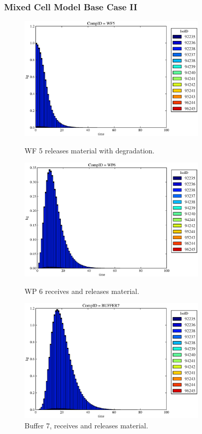 \begin{frame}[ctb!]
  \frametitle{Mixed Cell Model Base Case II}
  \begin{figure}
\begin{minipage}[b]{0.45\linewidth}

  \includegraphics[width=0.8\textwidth]{./images/mcIII1.eps}
  \caption[MCI WF Contaminants.]{
    WF 5 releases material with degradation. 
    }
  \label{fig:mcIIIwf5}
  
  \includegraphics[width=0.8\textwidth]{./images/mcIII2.eps}
  \caption[Case MCI WP Contaminants.]{ 
    WP 6 receives and releases material. 
    }
  \label{fig:mcIIIwp6}

\end{minipage}
\hspace{0.05\linewidth}
\begin{minipage}[b]{0.45\linewidth}
  \includegraphics[width=0.8\textwidth]{./images/mcIII3.eps}
  \caption[Case MCI Buffer Contaminants]{
    Buffer 7, receives and releases material.
    }
  \label{fig:mcIIIbuff}


\end{minipage}
\end{figure}
\end{frame}
